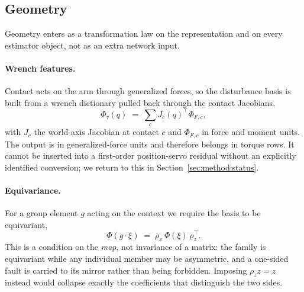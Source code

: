 \subsection{Geometry}\label{sec:method:geometry}

Geometry enters as a transformation law on the representation and on every
estimator object, not as an extra network input.

\paragraph{Wrench features.} Contact acts on the arm through generalized forces,
so the disturbance basis is built from a wrench dictionary pulled back through the
contact Jacobians,
\begin{equation}
\Phi_\tau(q) \;=\; \sum_c J_c(q)^\top \Phi_{F,c},
\label{eq:wrench}
\end{equation}
with $J_c$ the world-axis Jacobian at contact $c$ and $\Phi_{F,c}$ in force and
moment units. The output is in generalized-force units and therefore belongs in
torque rows. It cannot be inserted into a first-order position-servo residual
without an explicitly identified conversion; we return to this in
Section~\ref{sec:method:status}.

\paragraph{Equivariance.} For a group element $g$ acting on the context we require
the basis to be equivariant,
\begin{equation}
\Phi(g\cdot\xi) \;=\; \rho_x\,\Phi(\xi)\,\rho_z^\top .
\label{eq:equivariance}
\end{equation}
This is a condition on the \emph{map}, not invariance of a matrix: the family is
equivariant while any individual member may be asymmetric, and a one-sided fault
is carried to its mirror rather than being forbidden. Imposing $\rho_z z=z$ instead
would collapse exactly the coefficients that distinguish the two sides.

